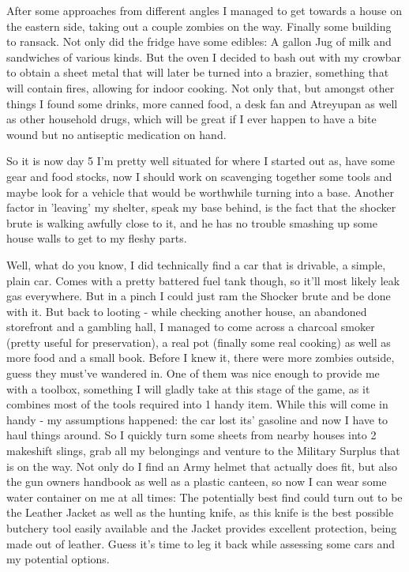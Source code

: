 \documentclass[11pt]{report}
\begin{document}
After some approaches from different angles I managed to get towards a house on the eastern side, taking out a couple zombies on the way. Finally some building to ransack. Not only did the fridge have some edibles: A gallon Jug of milk and sandwiches of various kinds. But the oven I decided to bash out with my crowbar to obtain a sheet metal that will later be turned into a brazier, something that will contain fires, allowing for indoor cooking. Not only that, but amongst other things I found some drinks, more canned food, a desk fan and Atreyupan as well as other household drugs, which will be great if I ever happen to have a bite wound but no antiseptic medication on hand.

So it is now day 5
I'm pretty well situated for where I started out as, have some gear and food stocks, now I should work on scavenging together some tools and maybe look for a vehicle that would be worthwhile turning into a base.
Another factor in 'leaving' my shelter, speak my base behind, is the fact that the shocker brute is walking awfully close to it, and he has no trouble smashing up some house walls to get to my fleshy parts.

Well, what do you know, I did technically find a car that is drivable, a simple, plain car. Comes with a pretty battered fuel tank though, so it'll most likely leak gas everywhere. But in a pinch I could just ram the Shocker brute and be done with it.
But back to looting - while checking another house, an abandoned storefront and a gambling hall, I managed to come across a charcoal smoker (pretty useful for preservation), a real pot (finally some real cooking) as well as more food and a small book. Before I knew it, there were more zombies outside, guess they must've wandered in. One of them was nice enough to provide me with a toolbox, something I will gladly take at this stage of the game, as it combines most of the tools required into 1 handy item.
While this will come in handy - my assumptions happened: the car lost its' gasoline and now I have to haul things around. So I quickly turn some sheets from nearby houses into 2 makeshift slings, grab all my belongings and venture to the Military Surplus that is on the way. Not only do I find an Army helmet that actually does fit, but also the gun owners handbook as well as a plastic canteen, so now I can wear some water container on me at all times: The potentially best find could turn out to be the Leather Jacket as well as the hunting knife, as this knife is the best possible butchery tool easily available and the Jacket provides excellent protection, being made out of leather. Guess it's time to leg it back while assessing some cars and my potential options.
\end{document}
